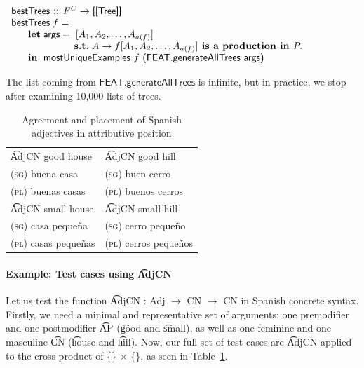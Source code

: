 \begin{EmptyItem}
$\begin{array}{p{0.25cm} p{0.2cm} p{0.75cm} l}
\multicolumn{4}{l}{\textsf{bestTrees :: } F^C \rightarrow \textsf{[[Tree]]}} \\
\multicolumn{4}{l}{\textsf{bestTrees} \; f =} \\
 & {\bf let} & \multicolumn{2}{l}{\textsf{args} = \; [A_1,A_2,\dots,A_{a(f)}]}  \\
 &    & &                             \textbf{s.t.} \;A \rightarrow
          f[A_1,A_2,\dots,A_{a(f)}] \textbf{ is a production in } P. \\
 &  {\bf in} & \multicolumn{2}{l}{\textsf{mostUniqueExamples } f 
                   \textsf{ (FEAT.generateAllTrees args)}}
\end{array}$
\end{EmptyItem}


\noindent The list coming from $\textsf{FEAT.generateAllTrees}$ is infinite, but
in practice, we stop after examining 10,000 lists of trees.


\begin{table}[h]
\centering
\begin{tabular}{| l | l |}
\hline
\t{AdjCN good house}   & \t{AdjCN good hill} \\
\textsc{(sg)} buena casa            & \textsc{(sg)} buen cerro \\
\textsc{(pl)} buenas casas          & \textsc{(pl)} buenos cerros \\ \hline

\t{AdjCN small house}   & \t{AdjCN small hill} \\

\textsc{(sg)} casa peque\~{n}a            & \textsc{(sg)} cerro peque\~{n}o \\
\textsc{(pl)} casas peque\~{n}as          & \textsc{(pl)} cerros peque\~{n}os \\ \hline
\end{tabular}
\caption{Agreement and placement of Spanish adjectives in attributive position}
\label{tab:adjAttr}
\end{table}


\paragraph{Example: Test cases using \t{AdjCN}} Let us test the function
\t{AdjCN : Adj $\rightarrow$ CN $\rightarrow$ CN} in Spanish
concrete syntax. 
Firstly, we need a minimal and representative set of arguments:
one premodifier and one postmodifier \t{AP} (\t{good} and
\t{small}), as well as one feminine and one masculine
\t{CN} (\t{house} and \t{hill}). Now, our full set of test cases are
\t{AdjCN} applied to the cross product of \{\} $\times$ \{\}, as seen in Table~\ref{tab:adjAttr}.



